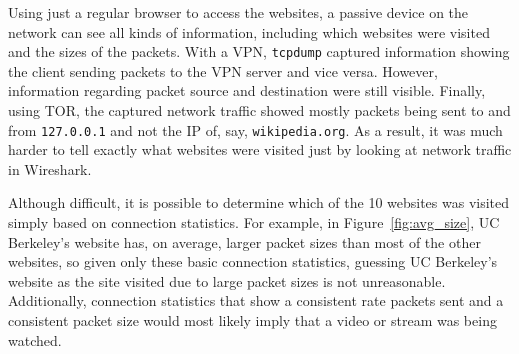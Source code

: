 \documentclass[11pt]{article}
\begin{document}
Using just a regular browser to access the websites, a passive device on the network can see
all kinds of information, including which websites were visited and the sizes of the packets. With a
VPN, \verb|tcpdump| captured information showing the client sending packets to the VPN server and
vice versa. However, information regarding packet source and destination were still visible. Finally,
using TOR, the captured network traffic showed mostly packets being sent to and from \verb|127.0.0.1|
and not the IP of, say, \verb|wikipedia.org|. As a result, it was much harder to tell exactly what
websites were visited just by looking at network traffic in Wireshark.

Although difficult, it is possible to determine which of the 10 websites was visited simply based on
connection statistics. For example, in Figure~\ref{fig:avg_size}, UC Berkeley's website has, on average,
larger packet sizes than most of the other websites, so given only these basic connection statistics,
guessing UC Berkeley's website as the site visited due to large packet sizes is not unreasonable.
Additionally, connection statistics that show a consistent rate packets sent and a consistent packet
size would most likely imply that a video or stream was being watched.
\end{document}
